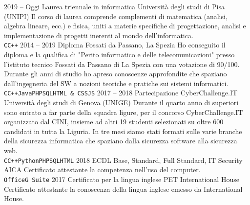\documentclass[9pt]{developercv} %
\begin{document}

\begin{entrylist}
	\entry
	{2019 -- Oggi}
	{Laurea triennale in informatica}
	{Università degli studi di Pisa (UNIPI)}
	{Il corso di laurea comprende complementi di matematica (analisi, algebra lineare, ecc.) e fisica, uniti a materie specifiche di progettazione, analisi e implementazione
		di progetti inerenti al mondo dell'informatica.\\
		\texttt{C}\slashsep\texttt{C++}}
	\entry
	{2014 -- 2019}
	{Diploma}
	{Fossati da Passano, La Spezia}
	{Ho conseguito il diploma e la qualifica di "Perito informatico e delle telecomunicazioni" presso l'istituto tecnico Fossati da Passano di La Spezia con una votazione di 90/100.
		Durante gli anni di studio ho apreso conoscenze approfondite che spaziano dall'ingegneria del SW a nozioni teoriche e pratiche sui sistemi informatici.\\
		\texttt{C}\slashsep\texttt{C++}\slashsep\texttt{Java}\slashsep\texttt{PHP}\slashsep\texttt{SQL}\slashsep\texttt{HTML \& CSS}\slashsep\texttt{JS}}
	\entry
	{2017 -- 2018}
	{Partecipazione CyberChallenge.IT}
	{Università degli studi di Genova (UNIGE)}
	{Durante il quarto anno di superiori sono entrato a far parte della squadra ligure, per il concorso CyberChallenge.IT organizzato dal CINI, insieme ad altri 19 studenti selezionati su oltre
		600 candidati in tutta la Liguria. In tre mesi siamo stati formati sulle varie branche della sicurezza informatica che spaziano dalla sicurezza software alla sicurezza web.\\
		\texttt{C}\slashsep\texttt{C++}\slashsep\texttt{Python}\slashsep\texttt{PHP}\slashsep\texttt{SQL}\slashsep\texttt{HTML}}
	\entry
	{2018}
	{ECDL Base, Standard, Full Standard, IT Security}
	{AICA}
  {Certificato attestante la competenza nell'uso del computer.\\
  \texttt{Office}\slashsep\texttt{G Suite}}
	\entry
	{2017}
	{Certificato per la lingua inglese PET}
	{International House}
	{Certificato attestante la conoscenza della lingua inglese emesso da International House.}
\end{entrylist}

\end{document}
